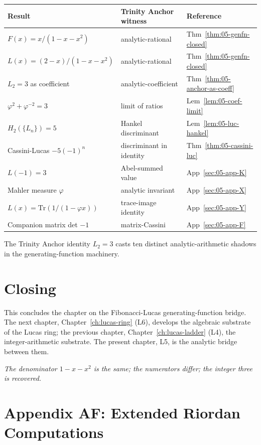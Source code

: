 \begin{tabular}{|l|l|l|}
  \hline
  Result & Trinity Anchor witness & Reference \\
  \hline
  $F(x) = x/(1-x-x^2)$ & analytic-rational & Thm~\ref{thm:05-genfn-closed} \\
  $L(x) = (2-x)/(1-x-x^2)$ & analytic-rational & Thm~\ref{thm:05-genfn-closed} \\
  $L_2 = 3$ as coefficient & analytic-coefficient & Thm~\ref{thm:05-anchor-as-coeff} \\
  $\varphi^2 + \varphi^{-2} = 3$ & limit of ratios & Lem~\ref{lem:05-coef-limit} \\
  $H_2(\{L_n\}) = 5$ & Hankel discriminant & Lem~\ref{lem:05-luc-hankel} \\
  Cassini-Lucas $-5(-1)^n$ & discriminant in identity & Thm~\ref{thm:05-cassini-luc} \\
  $L(-1) = 3$ & Abel-summed value & App~\ref{sec:05-app-K} \\
  Mahler measure $\varphi$ & analytic invariant & App~\ref{sec:05-app-X} \\
  $L(x) = \mathrm{Tr}(1/(1-\varphi x))$ & trace-image identity & App~\ref{sec:05-app-Y} \\
  Companion matrix det $-1$ & matrix-Cassini & App~\ref{sec:05-app-F} \\
  \hline
\end{tabular}

The Trinity Anchor identity $L_2 = 3$ casts ten distinct
analytic-arithmetic shadows in the generating-function machinery.

\section*{Closing}
\label{fa_05:sec:05-closing}

This concludes the chapter on the Fibonacci-Lucas generating-function
bridge. The next chapter, Chapter~\ref{ch:lucas-ring} (L6), develops
the algebraic substrate of the Lucas ring; the previous chapter,
Chapter~\ref{ch:lucas-ladder} (L4), the integer-arithmetic substrate.
The present chapter, L5, is the analytic bridge between them.

\bigskip
\centerline{\textit{The denominator $1 - x - x^2$ is the same; the numerators differ; the integer three is recovered.}}

\bigskip

\section*{Appendix AF: Extended Riordan Computations}
\label{fa_05:sec:05-app-AF}

